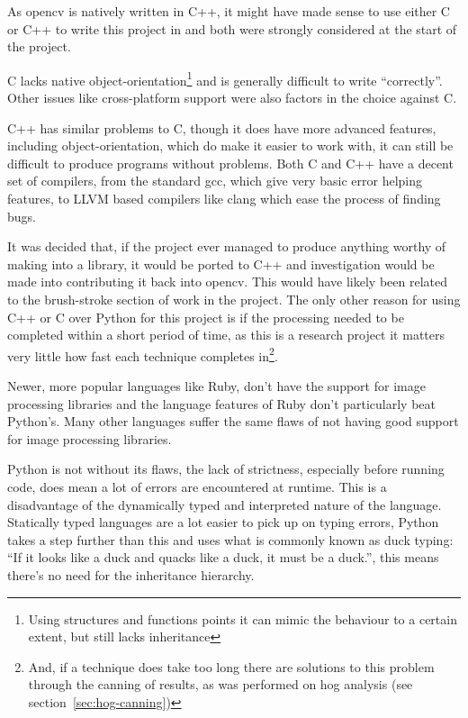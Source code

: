 As \gls{opencv} is natively written in C++, it might have made sense to use either C or C++ to write 
this project in and both were strongly considered at the start of the project.

C lacks native object-orientation\footnote{Using structures and functions points it can mimic the 
behaviour to a certain extent, but still lacks inheritance} and is generally difficult to write 
``correctly''. Other issues like cross-platform support were also factors in the choice against C.

C++ has similar problems to C, though it does have more advanced features, including 
object-orientation, which do make it easier to work with, it can still be difficult to produce 
programs without problems. Both C and C++ have a decent set of compilers, from the standard 
\gls{gcc}, which give very basic error helping features, to LLVM based compilers like clang which 
ease the process of finding bugs.

It was decided that, if the project ever managed to produce anything worthy of making into a
library, it would be ported to C++ and investigation would be made into contributing it back into
\gls{opencv}. This would have likely been related to the brush-stroke section of work in the project. 
The only other reason for using C++ or C over Python for this project is if the processing needed
to be completed within a short period of time, as this is a research project it matters very 
little how fast each technique completes in\footnote{And, if a technique does take too long there 
are solutions to this problem through the canning of results, as was performed on \gls{hog} 
analysis (see section~\ref{sec:hog-canning})}.

Newer, more popular languages like Ruby, don't have the support for image processing libraries and
the language features of Ruby don't particularly beat Python's. Many other languages suffer the
same flaws of not having good support for image processing libraries.

Python is not without its flaws, the lack of strictness, especially before running code, does mean
a lot of errors are encountered at runtime. This is a disadvantage of the dynamically typed and
interpreted nature of the language. Statically typed languages are a lot easier to pick up on
typing errors, Python takes a step further than this and uses what is commonly known as duck
typing: ``If it looks like a duck and quacks like a duck, it must be a duck.''\cite{2013Glossary},
this means there's no need for the inheritance hierarchy. 

